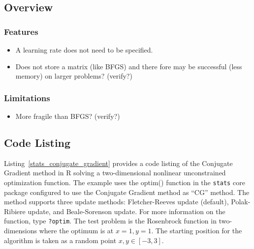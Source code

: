 \subsection{Overview}

\subsubsection{Features}

\begin{itemize}
	\item A learning rate does not need to be specified.
	\item Does not store a matrix (like BFGS) and there fore may be successful (less memory) on larger problems? (verify?)
\end{itemize}

\subsubsection{Limitations}

\begin{itemize}
	\item More fragile than BFGS? (verify?)
\end{itemize}

\subsection{Code Listing}
Listing~\ref{stats_conjugate_gradient} provides a code listing of the Conjugate Gradient method in R solving a two-dimensional nonlinear unconstrained optimization function.
The example uses the {optim()} function in the \texttt{stats} core package configured to use the Conjugate Gradient method as ``CG'' method. The method supports three update methods: Fletcher-Reeves update (default), Polak-Ribiere update, and Beale-Sorenson update. For more information on the function, type \texttt{?optim}.
The test problem is the Rosenbrock function in two-dimensions where the optimum is at $x=1, y=1$. The starting position for the algorithm is taken as a random point $x,y \in [-3,3]$.




